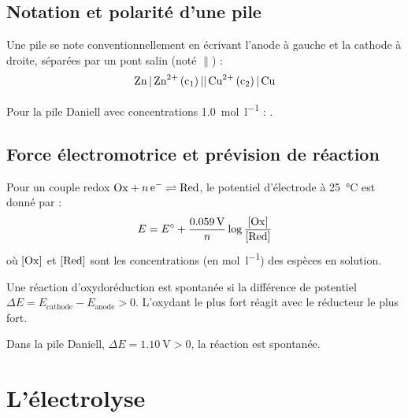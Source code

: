 \subsection{Notation et polarité d'une pile}

\begin{propriete}
Une pile se note conventionnellement en écrivant l'anode à gauche et la cathode à droite, séparées par un pont salin (noté $\parallel$) :
\[
\ce{Zn | Zn^2+ (c1) || Cu^2+ (c2) | Cu}
\]
\end{propriete}

\begin{exemple}
Pour la pile Daniell avec concentrations \SI{1.0}{\mol\per\litre} : .
\end{exemple}

\subsection{Force électromotrice et prévision de réaction}

\begin{loi}
Pour un couple redox $\ox + n\,\ce{e-} \rightleftharpoons \red$, le potentiel d'électrode à \SI{25}{\celsius} est donné par :
\[
E = E^\circ + \frac{\SI{0.059}{\volt}}{n} \log \frac{[\mathrm{Ox}]}{[\mathrm{Red}]}
\]
où $[\mathrm{Ox}]$ et $[\mathrm{Red}]$ sont les concentrations (en \si{\mol\per\litre}) des espèces en solution.
\end{loi}

\begin{propriete}
Une réaction d'oxydoréduction est spontanée si la différence de potentiel $\Delta E = E_{\text{cathode}} - E_{\text{anode}} > 0$. L'oxydant le plus fort réagit avec le réducteur le plus fort.
\end{propriete}

\begin{exemple}
Dans la pile Daniell, $\Delta E = \SI{1.10}{\volt} > 0$, la réaction  est spontanée.
\end{exemple}

\section{L'électrolyse}

